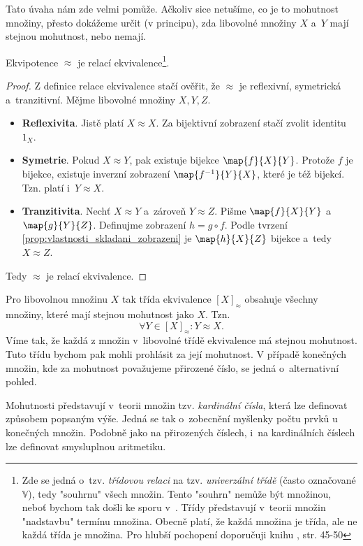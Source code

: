 Tato úvaha nám zde velmi pomůže. Ačkoliv sice netušíme, co je to mohutnost množiny, přesto dokážeme určit (v principu), zda libovolné množiny $X$ a~$Y$ mají stejnou mohutnost, nebo nemají.
\begin{lemma}
    Ekvipotence $\approx$ je relací ekvivalence\footnote{Zde se jedná o~tzv. \emph{třídovou relaci} na tzv. \emph{univerzální třídě} (často označované $\mathbb{V}$), tedy "souhrnu" všech množin. Tento "souhrn" nemůže být množinou, neboť bychom tak došli ke sporu v~\ZF{}. Třídy představují v~teorii množin "nadstavbu" termínu množina. Obecně platí, že každá množina je třída, ale ne každá třída je množina. Pro hlubší pochopení doporučuji knihu \cite{BalcarStepanek1986}, str. 45-50}.
\end{lemma}
\begin{proof}
    Z definice relace ekvivalence stačí ověřit, že $\approx$ je reflexivní, symetrická a~tranzitivní. Mějme libovolné množiny $X,Y,Z$.
    \begin{itemize}
        \item \textbf{Reflexivita}. Jistě platí $X\approx X$. Za bijektivní zobrazení stačí zvolit identitu $1_X$.
        \item \textbf{Symetrie}. Pokud $X\approx Y$, pak existuje bijekce $\map{f}{X}{Y}$. Protože $f$ je bijekce, existuje inverzní zobrazení $\map{f^{-1}}{Y}{X}$, které je též bijekcí. Tzn. platí i~$Y\approx X$.
        \item \textbf{Tranzitivita}. Nechť $X\approx Y$ a~zároveň $Y\approx Z$. Pišme $\map{f}{X}{Y}$ a~$\map{g}{Y}{Z}$. Definujme zobrazení $h=g\circ f$. Podle tvrzení \ref{prop:vlastnosti_skladani_zobrazeni} je $\map{h}{X}{Z}$ bijekce a~tedy $X\approx Z$.
    \end{itemize}
    Tedy $\approx$ je relací ekvivalence.
\end{proof}
Pro libovolnou množinu $X$ tak třída ekvivalence $[X]_\approx$ obsahuje všechny množiny, které mají stejnou mohutnost jako $X$. Tzn.
\begin{equation*}
    \forall Y\in [X]_\approx: Y\approx X.
\end{equation*}
Víme tak, že každá z množin v~libovolné třídě ekvivalence má stejnou mohutnost. Tuto třídu bychom pak mohli prohlásit za její mohutnost. V případě konečných množin, kde za mohutnost považujeme přirozené číslo, se jedná o~alternativní pohled.\par
Mohutnosti představují v~teorii množin tzv. \emph{kardinální čísla}, která lze definovat způsobem popsaným výše. Jedná se tak o~zobecnění myšlenky počtu prvků u konečných množin. Podobně jako na přirozených číslech, i~na kardinálních číslech lze definovat smysluplnou aritmetiku.
